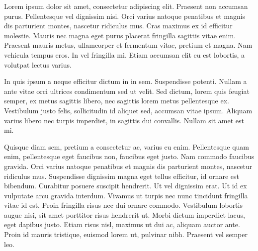 Lorem ipsum dolor sit amet, consectetur adipiscing elit. Praesent non accumsan purus. Pellentesque vel dignissim nisi. Orci varius natoque penatibus et magnis dis parturient montes, nascetur ridiculus mus. Cras maximus ex id efficitur molestie. Mauris nec magna eget purus placerat fringilla sagittis vitae enim. Praesent mauris metus, ullamcorper et fermentum vitae, pretium et magna. Nam vehicula tempus eros. In vel fringilla mi. Etiam accumsan elit eu est lobortis, a volutpat lectus varius.

In quis ipsum a neque efficitur dictum in in sem. Suspendisse potenti. Nullam a ante vitae orci ultrices condimentum sed ut velit. Sed dictum, lorem quis feugiat semper, ex metus sagittis libero, nec sagittis lorem metus pellentesque ex. Vestibulum justo felis, sollicitudin id aliquet sed, accumsan vitae ipsum. Aliquam varius libero nec turpis imperdiet, in sagittis dui convallis. Nullam sit amet est mi.

Quisque diam sem, pretium a consectetur ac, varius eu enim. Pellentesque quam enim, pellentesque eget faucibus non, faucibus eget justo. Nam commodo faucibus gravida. Orci varius natoque penatibus et magnis dis parturient montes, nascetur ridiculus mus. Suspendisse dignissim magna eget tellus efficitur, id ornare est bibendum. Curabitur posuere suscipit hendrerit. Ut vel dignissim erat. Ut id ex vulputate arcu gravida interdum. Vivamus ut turpis nec nunc tincidunt fringilla vitae id est. Proin fringilla risus nec dui ornare commodo. Vestibulum lobortis augue nisi, sit amet porttitor risus hendrerit ut. Morbi dictum imperdiet lacus, eget dapibus justo. Etiam risus nisl, maximus ut dui ac, aliquam auctor ante. Proin id mauris tristique, euismod lorem ut, pulvinar nibh. Praesent vel semper leo.